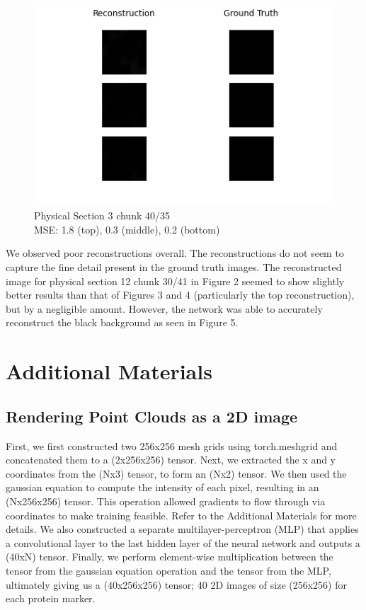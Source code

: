 \documentclass[10pt,twocolumn,letterpaper]{article}
\begin{document}
\begin{figure}[!h]
	\centering
	\captionsetup{justification=centering}
		\hspace*{-1cm}	
		\includegraphics[scale=0.65]{../figures/10_40_35.png}
	\caption{Physical Section 3 chunk 40/35\\ MSE: 1.8 (top), 0.3 (middle), 0.2 (bottom)}		
\end{figure}

We observed poor reconstructions overall. The reconstructions do not seem to capture the fine detail present in the ground truth images. The reconstructed image for physical section 12 chunk 30/41 in Figure 2 seemed to show slightly better results than that of Figures 3 and 4 (particularly the top reconstruction), but by a negligible amount. However, the network was able to accurately reconstruct the black background as seen in Figure 5.

\pagebreak

\section{Additional Materials}
\subsection{Rendering Point Clouds as a 2D image}
First, we first constructed two 256x256 mesh grids using torch.meshgrid and concatenated them to a (2x256x256) tensor. Next, we extracted the x and y coordinates from the (Nx3) tensor, to form an (Nx2) tensor. We then used the gaussian equation to compute the intensity of each pixel, resulting in an (Nx256x256) tensor. This operation allowed gradients to flow through via coordinates to make training feasible. Refer to the Additional Materials for more details. We also constructed a separate multilayer-perceptron (MLP) that applies a convolutional layer to the last hidden layer of the neural network and outputs a (40xN) tensor. Finally, we perform element-wise multiplication between the tensor from the gaussian equation operation and the tensor from the MLP, ultimately giving us a (40x256x256) tensor; 40 2D images of size (256x256) for each protein marker. 
\end{document}
